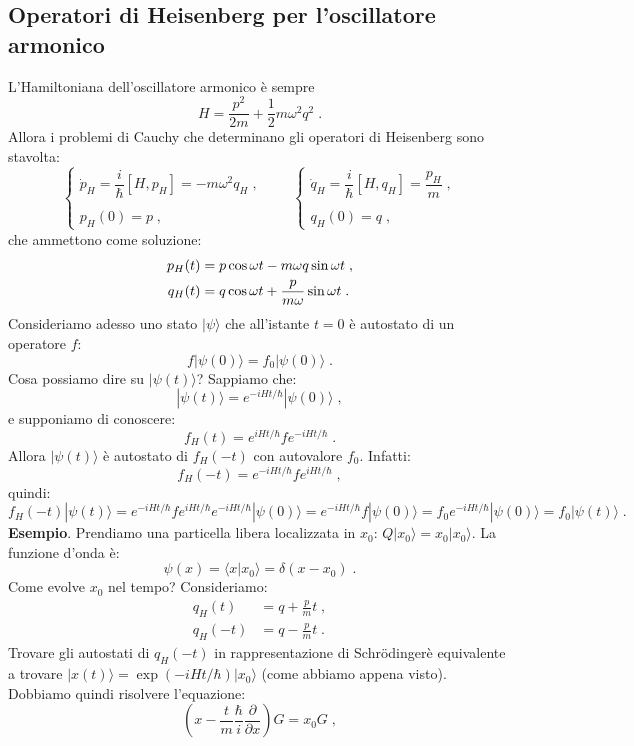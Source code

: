 \documentclass[10pt,a4paper]{report}
\theoremstyle{definition}
\numberwithin{equation}{section}
\newcommand{\bra}{\langle}
\newcommand{\ket}{\rangle}
\newcommand{\Sch}{Schrödinger}
\begin{document}
\subsection{Operatori di Heisenberg per l'oscillatore armonico}
L'Hamiltoniana dell'oscillatore armonico è sempre
$$
H=\frac{p^2}{2m}+\frac{1}{2}m\omega^2 q^2\;.
$$
Allora i problemi di Cauchy che determinano gli operatori di Heisenberg sono stavolta:
\begin{equation}
\begin{cases}
\dot{p}_H=\dfrac{i}{\hbar}[H,p_H]=-m\omega^2q_H\;, \\
\\
p_H(0)=p\;,
\end{cases} \qquad
\begin{cases}
\dot{q}_H=\dfrac{i}{\hbar}[H,q_H]=\dfrac{p_H}{m}\;, \\
\\
q_H(0)=q\;,
\end{cases}
\end{equation}
che ammettono come soluzione:
\begin{align}
p_H(t) &= p\cos\omega t-m\omega q\sin\omega t \notag\;, \\
q_H(t) &= q\cos\omega t+\frac{p}{m\omega}\sin\omega t\;.
\end{align}
Consideriamo adesso uno stato $|\psi\ket$ che all'istante $t=0$ è autostato di un operatore $f$:
$$
f|\psi(0)\ket=f_0|\psi(0)\ket\;.
$$
Cosa possiamo dire su $|\psi(t)\ket$? Sappiamo che:
$$
|\psi(t)\ket=e^{-iHt/\hbar}|\psi(0)\ket\;,
$$
e supponiamo di conoscere:
$$
f_H(t)=e^{iHt/\hbar}fe^{-iHt/\hbar}\;.
$$
Allora $|\psi(t)\ket$ è autostato di $f_H(-t)$ con autovalore $f_0$. Infatti:
$$
f_H(-t)=e^{-iHt/\hbar}fe^{iHt/\hbar}\;,
$$
quindi:
$$
f_H(-t)|\psi(t)\ket=e^{-iHt/\hbar}fe^{iHt/\hbar}e^{-iHt/\hbar}|\psi(0)\ket=e^{-iHt/\hbar}f|\psi(0)\ket=f_0e^{-iHt/\hbar}|\psi(0)\ket=f_0|\psi(t)\ket\;.
$$
\textbf{Esempio}. Prendiamo una particella libera localizzata in $x_0$: $Q|x_0\ket=x_0|x_0\ket$. La funzione d'onda è:
$$
\psi(x)=\bra x|x_0\ket=\delta(x-x_0)\;.
$$
Come evolve $x_0$ nel tempo? Consideriamo:
\begin{align*}
q_H(t)&=q+\frac{p}{m}t\;, \\
q_H(-t)&= q-\frac{p}{m}t\;.
\end{align*}
Trovare gli autostati di $q_H(-t)$ in rappresentazione di \Sch\;è equivalente a trovare $|x(t)\ket=\exp(-iHt/\hbar)|x_0\ket$ (come abbiamo appena visto). Dobbiamo quindi risolvere l'equazione:
\begin{equation}
\left(x-\frac{t}{m}\frac{\hbar}{i}\frac{\partial}{\partial x}\right)G=x_0G\;,
\end{equation}
\end{document}
